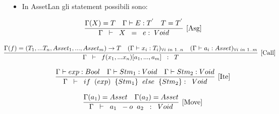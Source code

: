 \documentclass[12pt,twoside,openright,a4paper]{report}
\begin{document}
\begin{itemize}
    \item In AssetLan gli statement possibili sono:
    
    \begin{align*}
    \infer[\mathrm{[Asg]}]
    {\Gamma  \hspace{0.2cm} \vdash \hspace{0.2cm} X \hspace{0.2cm} = \hspace{0.2cm}  e : \hspace{0.1cm} Void} 
    {  \Gamma (X) = T & \Gamma \vdash E : T^{'} & T= T^{'} }
    \end{align*}

    \begin{align*}
    \hspace{-1cm}
    \infer[\mathrm{[Call]}]
    {   
    \Gamma  \hspace{0.2cm} \vdash \hspace{0.2cm} f(x_{1}, ...x_{n})[a_{1}, ..., a_{m}] \hspace{0.2cm} : \hspace{0.2cm} T} 
    {  \Gamma (f) = (T_{1},...T_{n},Asset_{1},...,Asset_{m}) \to T  & (\Gamma \vdash x_{i} : T_{i})_{\forall{i \hspace{0.1cm}in \hspace{0.1cm} 1..n}} & (\Gamma \vdash a_{i} : Asset)_{\forall{i \hspace{0.1cm} in  \hspace{0.1cm}1..m}}}
    \end{align*}
  
    \begin{align*}
    \infer[\mathrm{[Ite]}]
    {\Gamma \hspace{0.2cm} \vdash  \hspace{0.2cm}if\hspace{0.2cm} (exp)\hspace{0.2cm} \{Stm_{1}\}\hspace{0.2cm} else \hspace{0.2cm}\{Stm_{2}\} : \hspace{0.2cm}Void } 
    {  \Gamma \vdash exp : Bool & \Gamma \vdash Stm_{1} : Void & \Gamma \vdash Stm_{2} : Void }
    \end{align*}

    \begin{align*}
    \infer[\mathrm{[Move]}]
    {\Gamma \hspace{0.2cm} \vdash  \hspace{0.2cm}a_{1}\hspace{0.2cm} -o\hspace{0.2cm} a_{2} \hspace{0.2cm}: \hspace{0.2cm}Void } 
    {  \Gamma(a_{1}) = Asset & \Gamma(a_{2}) = Asset  }
    \end{align*}
    

\end{itemize}
\end{document}
